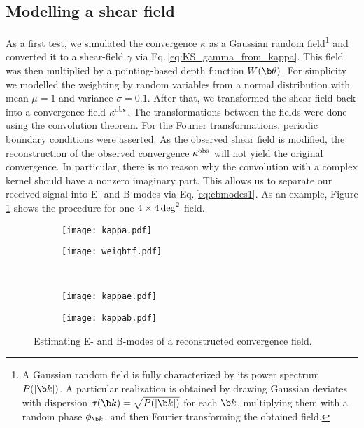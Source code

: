 \subsection{Modelling a shear field}
\label{sec:model_kappa}
As a first test, we simulated the convergence $\kappa$ as a Gaussian random field\footnote{A Gaussian random field is fully characterized by its power spectrum $P(|\b k|)$. A particular realization is obtained by drawing Gaussian deviates with dispersion $\sigma(\b k)=\sqrt{P(|\b k|)}$ for each $\b k$, multiplying them with a random phase $\phi_{\b k}$, and then Fourier transforming the obtained field.} and converted it to a shear-field $\gamma$ via Eq.\,\eqref{eq:KS_gamma_from_kappa}. This field was then multiplied by a pointing-based depth function $W(\b\theta)$. For simplicity we modelled the weighting by random variables from a normal distribution with mean $\mu = 1$ and variance $\sigma = 0.1$. After that, we transformed the shear field back into a convergence field $\kappa^{\rm{obs}}$. The transformations between the fields were done using the convolution theorem. For the Fourier transformations, periodic boundary conditions were asserted. As the observed shear field is modified, the reconstruction of the observed convergence $\kappa^{\rm{obs}}$ will not yield the original convergence. In particular, there is no reason why the convolution with a complex kernel should have a nonzero imaginary part. This allows us to separate our received signal into E- and B-modes via Eq.\,\eqref{eq:ebmodes1}. As an example, Figure \ref{fig:way_for_kappa} shows the procedure for one $4\times 4\,\rm{deg}^2$-field.
\begin{figure}
\centering
\begin{subfigure}[c]{0.49\textwidth}
\texttt{[image: kappa.pdf]}
\end{subfigure}
\begin{subfigure}[c]{0.49\textwidth}
\texttt{[image: weightf.pdf]}
\end{subfigure}\\
\begin{subfigure}[c]{0.49\textwidth}
\texttt{[image: kappae.pdf]}
\end{subfigure}
\begin{subfigure}[c]{0.49\textwidth}
\texttt{[image: kappab.pdf]}
\end{subfigure}
\caption{Estimating E- and B-modes of a reconstructed convergence field.}
\label{fig:way_for_kappa}
\end{figure}

